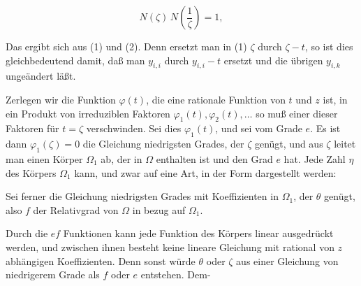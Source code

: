 \[
N(\zeta)\,N\left(\frac{1}{\zeta}\right) = 1,
\]


Das ergibt sich aus (1) und (2). Denn ersetzt man in (1) $\zeta$ durch $\zeta - t$, so ist dies gleichbedeutend damit, daß man $y_{i,i}$ durch $y_{i,i} - t$ ersetzt und die übrigen $y_{i,k}$ ungeändert läßt.

Zerlegen wir die Funktion $\varphi(t)$, die eine rationale Funktion von $t$ und $z$ ist, in ein Produkt von irreduziblen Faktoren $\varphi_1(t), \varphi_2(t), \dots$ so muß einer dieser Faktoren für $t = \zeta$ verschwinden. Sei dies $\varphi_1(t)$, und
sei vom Grade $e$. Es ist dann $\varphi_1(\zeta) = 0$ die Gleichung niedrigsten Grades, der $\zeta$ genügt, und aus $\zeta$ leitet man einen Körper $\Omega_1$ ab, der in $\Omega$ enthalten ist und den Grad $e$ hat. Jede Zahl $\eta$ des Körpers $\Omega_1$ kann, und zwar auf eine Art, in der Form dargestellt werden:

Sei ferner
die Gleichung niedrigsten Grades mit Koeffizienten in $\Omega_1$, der $\theta$ genügt, also $f$ der Relativgrad von $\Omega$ in bezug auf $\Omega_1$.

Durch die $ef$ Funktionen
kann jede Funktion des Körpers linear ausgedrückt werden, und zwischen ihnen besteht keine lineare Gleichung mit rational von $z$ abhängigen Koeffizienten. Denn sonst würde $\theta$ oder $\zeta$ aus einer Gleichung von niedrigerem Grade als $f$ oder $e$ entstehen. Dem-
